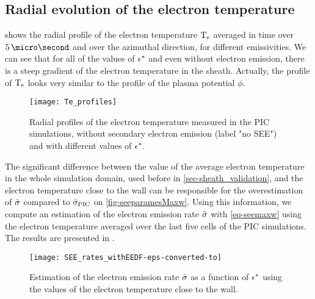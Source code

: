    \subsection{Radial evolution of the electron temperature}
     \label{subsec-Radial_Te}
     
      shows the radial profile of the electron temperature $\mathrm{T_e}$ averaged in time over $5\,\micro\second$ and over the azimuthal direction, for different emissivities.
     We can see that for all of the values of $\epsilon^{*}$ and even without electron emission, there is a steep gradient of the electron temperature in the sheath.
     Actually, the profile of $\mathrm{T_e}$ looks very similar to the profile of the plasma potential $\phi$.
   
   \begin{figure}[!hbt]
     \centering
     \texttt{[image: Te\_profiles]}
     \caption{Radial profiles of the electron temperature measured in the \acs{PIC} simulations, without secondary electron emission (label "no SEE") and with different values of $\epsilon^{*}$.}
     \label{fig-te_profile_see}
   \end{figure}

   The significant difference between the value of the average electron temperature in the whole simulation domain, used before in \cref{sec-sheath_validation}, and the electron temperature close to the wall can be responsible for the overestimation of $ \bar{\sigma }$ compared to $ \bar{\sigma }_{\rm PIC}$ on \cref{fig-seeparamesMaxw}.
   Using this information, we compute an estimation of the electron emission rate $ \bar{\sigma }$ with \cref{eq-seemaxw} using the electron temperature averaged over the last five cells of the PIC simulations.
   The results are presented in .
   
   \begin{figure}[!hbt]
     \centering
     \texttt{[image: SEE\_rates\_withEEDF-eps-converted-to]}
     \caption{Estimation of the electron emission rate $ \bar{\sigma }$ as a function of $\epsilon^{*}$ using the values of the electron temperature close to the wall.}
     \label{fig-rate_pic_wall}
   \end{figure}
   
